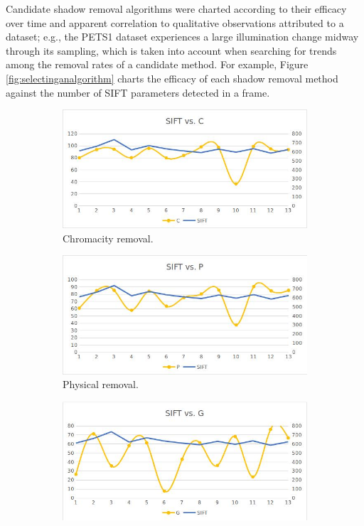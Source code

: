 \documentclass[12pt]{report}
\begin{document}
Candidate shadow removal algorithms were charted according to their efficacy over time and apparent correlation to qualitative observations attributed to a dataset; e.g., the PETS1 dataset experiences a large illumination change midway through its sampling, which is taken into account when searching for trends among the removal rates of a candidate method. For example, Figure \ref{fig:selectinganalgorithm} charts the efficacy of each shadow removal method against the number of SIFT parameters detected in a frame.

\begin{figure}
\centering
\begin{subfigure}{.49\linewidth}
  \includegraphics[width=1\linewidth]{figures/selectinganalgorithm_chromacity.jpg}
  \caption{Chromacity removal.}
\end{subfigure}
\hfill
\begin{subfigure}{.49\linewidth}
  \includegraphics[width=1\linewidth]{figures/selectinganalgorithm_physical.jpg}
  \caption{Physical removal.}
\end{subfigure}
\hfill
\begin{subfigure}{.49\linewidth}
  \includegraphics[width=1\linewidth]{figures/selectinganalgorithm_geometry.jpg}

\end{subfigure}
\end{figure}
\end{document}
